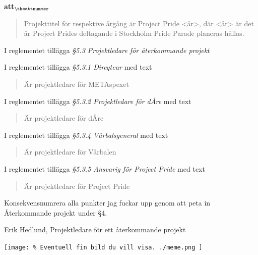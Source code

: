 \documentclass[a4paper]{article}
\begin{document}
\begin{list}{\bf att$_{\theattnummer}$}{}
\begin{quote}
        Projekttitel för respektive årgång är Project Pride <år>, där <år> är det år Project Prides deltagande i Stockholm Pride Parade planeras hållas.
    \end{quote}


\item I reglementet tillägga \textit{\S5.3 Projektledare för återkommande projekt}
\item I reglementet tillägga \textit{\S5.3.1 Direqteur} med text
    \begin{quote}
        Är projektledare för METAspexet
    \end{quote}
\item I reglementet tillägga \textit{\S5.3.2 Projektledare för dÅre} med text
    \begin{quote}
        Är projektledare för dÅre
    \end{quote}
\item I reglementet tillägga \textit{\S5.3.4 Vårbalsgeneral} med text
    \begin{quote}
        Är projektledare för Vårbalen
    \end{quote}
\item I reglementet tillägga \textit{\S5.3.5 Ansvarig för Project Pride} med text
    \begin{quote}
        Är projektledare för Project Pride
    \end{quote}


\item Konsekvensnumrera alla punkter jag fuckar upp genom att peta in Återkommande projekt under \S4.
\end{list}

\vspace{2cm}
\noindent
Erik Hedlund, Projektledare för ett återkommande projekt

\begin{center}
\texttt{[image: 
    \% Eventuell fin bild du vill visa.
    ./meme.png
]}
\end{center}
\end{document}
